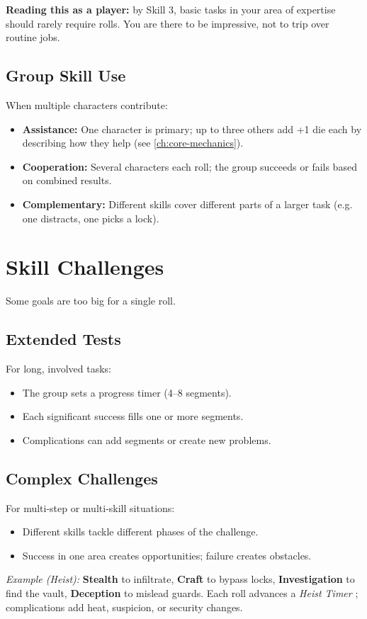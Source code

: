 \noindent\textbf{Reading this as a player:} by Skill 3, basic tasks in your area of
expertise should rarely require rolls. You are there to be impressive, not to
trip over routine jobs.

\subsection{Group Skill Use}
\label{sec:group-skills}
When multiple characters contribute:
\begin{itemize}
  \item \textbf{Assistance:} One character is primary; up to three others add +1 die each by describing how they help (see \ref{ch:core-mechanics}).
  \item \textbf{Cooperation:} Several characters each roll; the group succeeds or fails based on combined results.
  \item \textbf{Complementary:} Different skills cover different parts of a larger task (e.g. one distracts, one picks a lock).
\end{itemize}

\section{Skill Challenges}
\label{sec:skill-challenges}

Some goals are too big for a single roll.

\subsection{Extended Tests}
\label{sec:extended-tests}
For long, involved tasks:
\begin{itemize}
  \item The group sets a progress timer (4--8 segments).
  \item Each significant success fills one or more segments.
  \item Complications can add segments or create new problems.
\end{itemize}

\subsection{Complex Challenges}
\label{sec:complex-challenges}
For multi-step or multi-skill situations:
\begin{itemize}
  \item Different skills tackle different phases of the challenge.
  \item Success in one area creates opportunities; failure creates obstacles.
\end{itemize}
\noindent\textit{Example (Heist):} \textbf{Stealth} to infiltrate, \textbf{Craft} to bypass
locks, \textbf{Investigation} to find the vault, \textbf{Deception} to mislead guards.
Each roll advances a \emph{Heist Timer }; complications add heat, suspicion, or
security changes.

